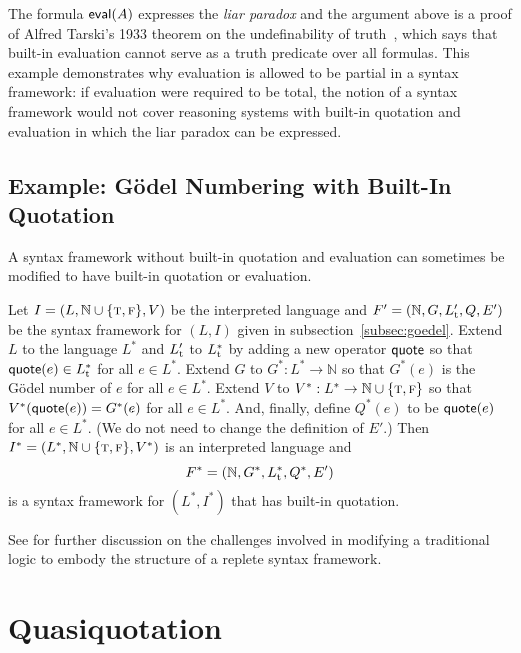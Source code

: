 \documentclass[11pt,fleqn]{article}
\newcommand{\bsp}{\begin{sloppypar}}
\newcommand{\esp}{\end{sloppypar}}
\newcommand{\set}[1]{{\{ #1 \}}}
\newcommand{\mname}[1]{\mbox{\sf #1}}
\newcommand{\tarrow}{\rightarrow}
\newcommand{\TRUE}{\mbox{{\sc t}}}
\newcommand{\FALSE}{\mbox{{\sc f}}}
\begin{document}
The formula $\mname{eval}(A)$ expresses the \emph{liar paradox} and
the argument above is a proof of Alfred Tarski's 1933 theorem on the
undefinability of truth~\cite{Tarski33,Tarski35,Tarski35a}, which says
that built-in evaluation cannot serve as a truth predicate over all
formulas.  This example demonstrates why evaluation is allowed to be
partial in a syntax framework: if evaluation were required to be
total, the notion of a syntax framework would not cover reasoning
systems with built-in quotation and evaluation in which the liar
paradox can be expressed.

\subsection{Example: G\"odel Numbering with Built-In Quotation}

A syntax framework without built-in quotation and evaluation can
sometimes be modified to have built-in quotation or evaluation.

\bsp Let $I = (L, \mathbb{N} \cup \set{\TRUE,\FALSE}, V)$ be the
interpreted language and $F' = (\mathbb{N},G,L'_{\rm t},Q,E')$ be the
syntax framework for $(L,I)$ given in subsection~\ref{subsec:goedel}.
Extend $L$ to the language $L^{\ast}$ and $L'_{\rm t}$ to
$L^{\ast}_{\rm t}$ by adding a new operator $\mname{quote}$ so that
$\mname{quote}(e) \in L^{\ast}_{\rm t}$ for all $e \in L^{\ast}$.
Extend $G$ to $G^{\ast}: L^{\ast} \tarrow \mathbb{N}$ so that
$G^{\ast}(e)$ is the G\"odel number of $e$ for all $e \in L^{\ast}$.
Extend $V$ to $V^{\ast} : L^{\ast} \tarrow \mathbb{N} \cup
\set{\TRUE,\FALSE}$ so that $V^{\ast}(\mname{quote}(e)) = G^{\ast}(e)$
for all $e \in L^{\ast}$.  And, finally, define $Q^{\ast}(e)$ to be
$\mname{quote}(e)$ for all $e \in L^{\ast}$.  (We do not need to
change the definition of $E'$.)  Then $I^{\ast} = (L^{\ast},
\mathbb{N} \cup \set{\TRUE,\FALSE}, V^{\ast})$ is an interpreted
language and \[F^{\ast} = (\mathbb{N},G^{\ast},L^{\ast}_{\rm
  t},Q^{\ast},E')\] is a syntax framework for $(L^{\ast},I^{\ast})$
that has built-in quotation. \esp

See \cite{Farmer13} for further discussion on the challenges involved
in modifying a traditional logic to embody the structure of a replete
syntax framework.

\section{Quasiquotation} \label{sec:quasiquotation}
\end{document}
